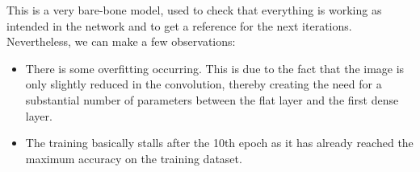 This is a very bare-bone model, used to check that everything is working as intended in the network and to get a reference for the next iterations. Nevertheless, we can make a few observations:
\begin{itemize}
\item There is some overfitting occurring. This is due to the fact that the image is only slightly reduced in the convolution, thereby creating the need for a substantial number of parameters between the flat layer and the first dense layer.
\item The training basically stalls after the 10th epoch as it has already reached the maximum accuracy on the training dataset.
\end{itemize}

